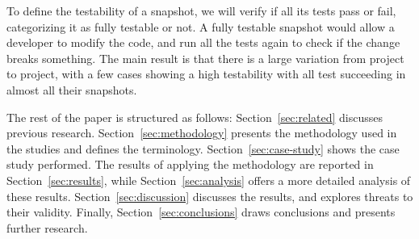 To define the testability of a snapshot, we will verify if all its tests pass or fail, categorizing it as fully testable or not.
A fully testable snapshot would allow a developer to modify the code, and run all the tests again to check if the change breaks something.
The main result is that there is a large variation from project to project, with a few cases showing a high testability with all test succeeding in almost all their snapshots. 



The rest of the paper is structured as follows:
Section~\ref{sec:related} discusses previous research.
Section~\ref{sec:methodology} presents the methodology used in the studies and defines the terminology. 
Section~\ref{sec:case-study} shows the case study performed.
The results of applying the methodology are reported in Section~\ref{sec:results}, while Section~\ref{sec:analysis} offers a more detailed analysis of these results.
Section~\ref{sec:discussion} discusses the results, and explores threats to their validity.
Finally, Section~\ref{sec:conclusions} draws conclusions and presents further research.
